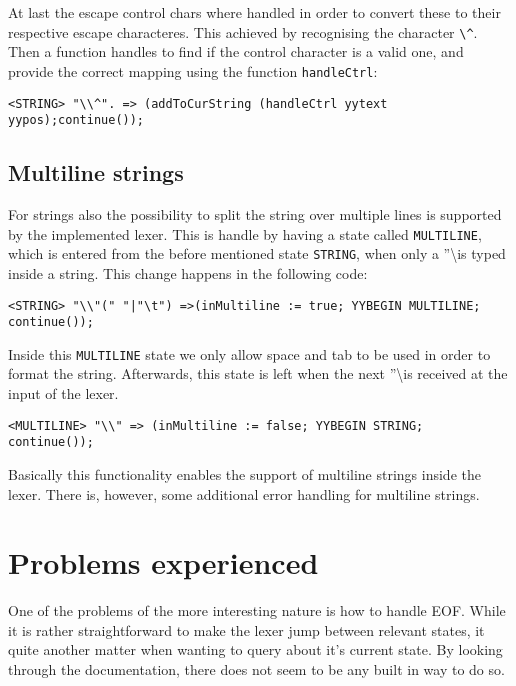 \documentclass{article}
\begin{document}
At last the escape control chars where handled in order to convert these to their respective escape characteres. This achieved by recognising the character \texttt{\textbackslash \^}. Then a function handles to find if the control character is a valid one, and provide the correct mapping using the function \texttt{handleCtrl}:

\begin{lstlisting}[frame=single]
<STRING> "\\^". => (addToCurString (handleCtrl yytext yypos);continue());
\end{lstlisting}

\subsection{Multiline strings}
For strings also the possibility to split the string over multiple lines is supported by the implemented lexer. This is handle by having a state called \texttt{MULTILINE}, which is entered from the before mentioned state \texttt{STRING}, when only a ''\textbackslash is typed inside a string. This change happens in the following code:

\begin{lstlisting}[frame=single]
<STRING> "\\"(" "|"\t") =>(inMultiline := true; YYBEGIN MULTILINE; continue());
\end{lstlisting}

Inside this \texttt{MULTILINE} state we only allow space and tab to be used in order to format the string.
Afterwards, this state is left when the next ''\textbackslash is received at the input of the lexer. 
\begin{lstlisting}[frame=single]
<MULTILINE> "\\" => (inMultiline := false; YYBEGIN STRING; continue());
\end{lstlisting}

Basically this functionality enables the support of multiline strings inside the lexer. There is, however, some additional error handling for multiline strings.

\section{Problems experienced}
One of the problems of the more interesting nature is how to handle EOF. While it is rather straightforward to make the lexer jump between relevant states, it quite another matter when wanting to query about it's current state. By looking through the documentation, there does not seem to be any built in way to do so.
\end{document}
